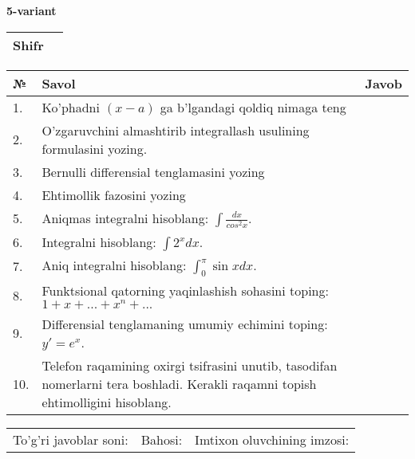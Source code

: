 \documentclass{article}
\begin{document}
  \egroup
  
  \newpage
  
  
  \textbf{5-variant}\\
  
  \bgroup
  \def\arraystretch{1.6} %
  
  \begin{tabular}{|m{5.7cm}|m{9.5cm}|}
  \hline
  Shifr & \\
  \hline
  \end{tabular}
  
  \vspace{1cm}
  
  \begin{tabular}{|m{0.7cm}|m{10cm}|m{4cm}|}
  \hline
  № & Savol & Javob \\
  \hline
  1. & Ko'phadni \((x - a)\) ga b'lgandagi qoldiq nimaga teng &  \\
  \hline
  2. & O'zgaruvchini almashtirib integrallash usulining formulasini yozing. &  \\
  \hline
  3. & Bernulli differensial tenglamasini yozing &  \\
  \hline
  4. & Ehtimollik fazosini yozing &  \\
  \hline
  5. & Aniqmas integralni hisoblang: \(\int \frac{dx}{cos^{2}x}\). &  \\
  \hline
  6. & Integralni hisoblang: \(\int {2^{x}dx}\). &  \\
  \hline
  7. & Aniq integralni hisoblang: \(\int_{0}^{\pi}{\sin xdx}\). &  \\
  \hline
  8. & Funktsional qatorning yaqinlashish sohasini toping:\(1 + x + ... + x^{n} + ...\) &  \\
  \hline
  9. & Differensial tenglamaning umumiy echimini toping: \(y' = e^{x}\). &  \\
  \hline
  10. & Telefon raqamining oxirgi tsifrasini unutib, tasodifan nomerlarni tera boshladi. Kerakli raqamni topish ehtimolligini hisoblang. &  \\
  \hline
  \end{tabular}
  
  \vspace{1cm}
  
  \begin{tabular}{lll}
  To'g'ri javoblar soni: \underline{\hspace{1.5cm}} & 
  Bahosi: \underline{\hspace{1.5cm}} & 
  Imtixon oluvchining imzosi: \underline{\hspace{2cm}} \\
  \end{tabular}
  
\end{document}
